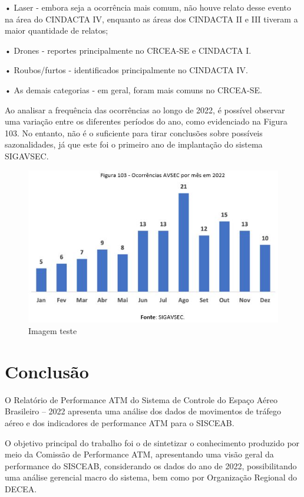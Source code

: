\documentclass[
]{book}
\begin{document}
• Laser - embora seja a ocorrência mais comum, não houve relato desse evento na área do CINDACTA IV, enquanto as áreas dos CINDACTA II e III tiveram a maior quantidade de relatos;

• Drones - reportes principalmente no CRCEA-SE e CINDACTA I.

• Roubos/furtos - identificados principalmente no CINDACTA IV.

• As demais categorias - em geral, foram mais comuns no CRCEA-SE.

Ao analisar a frequência das ocorrências ao longo de 2022, é possível observar uma variação entre os diferentes períodos do ano, como evidenciado na Figura 103. No entanto, não é o suficiente para tirar conclusões sobre possíveis sazonalidades, já que este foi o primeiro ano de implantação do sistema SIGAVSEC.

\begin{figure}
\centering
\includegraphics{imagens/fig90.jpg}
\caption{Imagem teste}
\end{figure}

\hypertarget{conclusuxe3o}{%
\chapter{Conclusão}\label{conclusuxe3o}}

O Relatório de Performance ATM do Sistema de Controle do Espaço Aéreo Brasileiro -- 2022 apresenta uma análise dos dados de movimentos de tráfego aéreo e dos indicadores de performance ATM para o SISCEAB.

O objetivo principal do trabalho foi o de sintetizar o conhecimento produzido por meio da Comissão de Performance ATM, apresentando uma visão geral da performance do SISCEAB, considerando os dados do ano de 2022, possibilitando uma análise gerencial macro do sistema, bem como por Organização Regional do DECEA.
\end{document}
